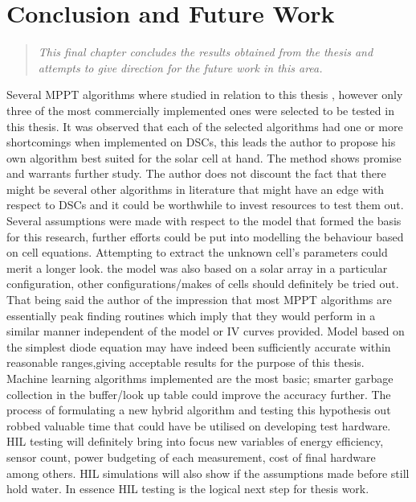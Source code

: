 \chapter{Conclusion and Future Work}
\begin{quote} 
\it This final chapter concludes the results obtained from the thesis and attempts to give direction for the future work in this area.
\end{quote}

Several \ac{MPPT} algorithms where studied in relation to this thesis , however only three of the most commercially implemented ones were selected to be tested in this thesis. It was observed that each of the selected algorithms had one or more shortcomings when implemented on \ac{DSCs}, this leads the author to propose his own algorithm best suited for the solar cell at hand. The method shows promise and warrants further study. The author does not discount the fact that there might be several other algorithms in literature that might have an edge with respect to \ac{DSCs} and it could be worthwhile to invest resources to test them out.\\

Several assumptions were made with respect to the model that formed the basis for this research, further efforts could be put into modelling the behaviour based on cell equations. Attempting to extract the unknown cell's parameters could merit a longer look. the model was also based on a solar array in a particular configuration, other configurations/makes of cells should definitely be tried out. That being said the author of the impression that most \ac{MPPT} algorithms are essentially peak finding routines which imply that they would perform in a similar manner independent of the model or IV curves provided. Model based on the simplest diode equation may have indeed been sufficiently accurate within reasonable ranges,giving acceptable results for the purpose of this thesis.\\

Machine learning algorithms implemented are the most basic; smarter garbage collection in the buffer/look up table could improve the accuracy further. The process of formulating a new hybrid algorithm and testing this hypothesis out robbed valuable time that could have be utilised on developing test hardware. \ac{HIL} testing will definitely bring into focus new variables of energy efficiency, sensor count, power budgeting of each measurement, cost of final hardware among others. \ac{HIL} simulations will also show if the assumptions made before still hold water. In essence \ac{HIL} testing is the logical next step for thesis work.\\

